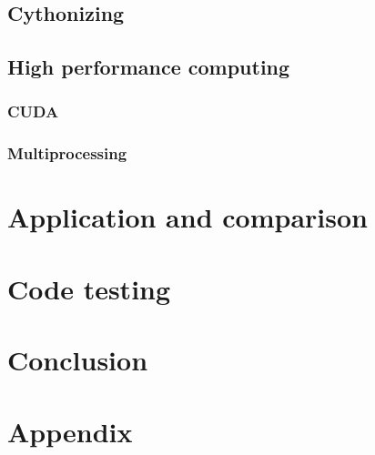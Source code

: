 \documentclass{article}
\begin{document}
\subsection{Cythonizing}
\subsection{High performance computing}
\subsubsection{CUDA}
\subsubsection{Multiprocessing}
\section{Application and comparison}
\section{Code testing}
\section{Conclusion}
\section{Appendix}
\end{document}
